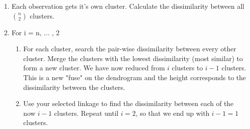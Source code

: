\documentclass{article}
\begin{document}
\begin{enumerate}
    \item Each observation gets it's own cluster. Calculate the dissimilarity between all ${n \choose 2}$ clusters. 
    \item For i = n, ... , 2
    \begin{enumerate}
        \item For each cluster, search the pair-wise dissimilarity between every other cluster. Merge the clusters with the lowest dissimilarity (most similar) to form a new cluster. We have now reduced from $i$ clusters to $i-1$ clusters. This is a new "fuse" on the dendrogram and the height corresponds to the dissimilarity between the clusters.  
        \item Use your selected linkage to find the dissimilarity between each of the now $i-1$ clusters. Repeat until $i=2$, so that we end up with $i-1=1$ clusters.      
    \end{enumerate}
\end{enumerate}
\end{document}
